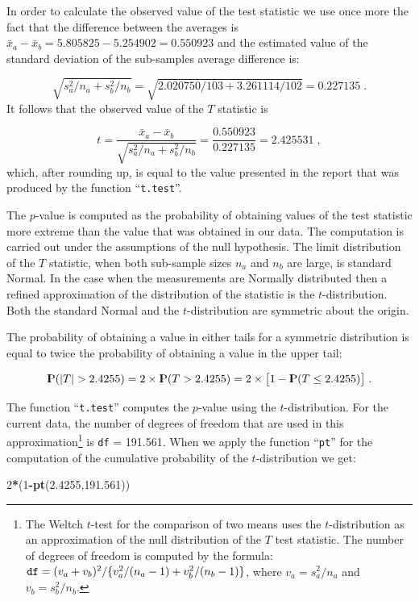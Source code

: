 \documentclass[]{krantz}
\makeatletter
\newenvironment{Shaded}{\begin{snugshade}}{\end{snugshade}}
\newcommand{\KeywordTok}[1]{\textcolor[rgb]{0.13,0.29,0.53}{\textbf{#1}}}
\newcommand{\DecValTok}[1]{\textcolor[rgb]{0.00,0.00,0.81}{#1}}
\newcommand{\FloatTok}[1]{\textcolor[rgb]{0.00,0.00,0.81}{#1}}
\newcommand{\OperatorTok}[1]{\textcolor[rgb]{0.81,0.36,0.00}{\textbf{#1}}}
\newcommand{\NormalTok}[1]{#1}
\newcommand{\Prob}{{\rm I\kern-.3em P}}
\newenvironment{kframe}{%
\medskip{}
\setlength{\fboxsep}{.8em}
 \def\at@end@of@kframe{}%
 \ifinner\ifhmode%
  \def\at@end@of@kframe{\end{minipage}}%
  \begin{minipage}{\columnwidth}%
 \fi\fi%
 \def\FrameCommand##1{\hskip\@totalleftmargin \hskip-\fboxsep
 \colorbox{shadecolor}{##1}\hskip-\fboxsep
     \hskip-\linewidth \hskip-\@totalleftmargin \hskip\columnwidth}%
 \MakeFramed {\advance\hsize-\width
   \@totalleftmargin\z@ \linewidth\hsize
   \@setminipage}}%
 {\par\unskip\endMakeFramed%
 \at@end@of@kframe}
\renewenvironment{Shaded}{\begin{kframe}}{\end{kframe}}
\theoremstyle{definition}
\theoremstyle{definition}
\theoremstyle{definition}
\theoremstyle{remark}
\makeatother
\begin{document}
In order to calculate the observed value of the test statistic we use
once more the fact that the difference between the averages is
\(\bar x_a - \bar x_b = 5.805825 - 5.254902 = 0.550923\) and the
estimated value of the standard deviation of the sub-samples average
difference is:

\[\sqrt{s_a^2/n_a + s_b^2/n_b} = \sqrt{2.020750/103 + 3.261114/102} = 0.227135\;.\]
It follows that the observed value of the \(T\) statistic is

\[t = \frac{\bar x_a - \bar x_b}{\sqrt{s_a^2/n_a + s_b^2/n_b}} = \frac{0.550923}{0.227135} = 2.425531\;,\]
which, after rounding up, is equal to the value presented in the report
that was produced by the function ``\texttt{t.test}''.

The \(p\)-value is computed as the probability of obtaining values of
the test statistic more extreme than the value that was obtained in our
data. The computation is carried out under the assumptions of the null
hypothesis. The limit distribution of the \(T\) statistic, when both
sub-sample sizes \(n_a\) and \(n_b\) are large, is standard Normal. In
the case when the measurements are Normally distributed then a refined
approximation of the distribution of the statistic is the
\(t\)-distribution. Both the standard Normal and the \(t\)-distribution
are symmetric about the origin.

The probability of obtaining a value in either tails for a symmetric
distribution is equal to twice the probability of obtaining a value in
the upper tail:

\[\Prob( |T| > 2.4255) = 2 \times \Prob( T > 2.4255) =  2 \times \big [1 - \Prob( T \leq  2.4255)\big ]\;.\]

The function ``\texttt{t.test}'' computes the \(p\)-value using the
\(t\)-distribution. For the current data, the number of degrees of
freedom that are used in this approximation\footnote{The Weltch
  \(t\)-test for the comparison of two means uses the \(t\)-distribution
  as an approximation of the null distribution of the \(T\) test
  statistic. The number of degrees of freedom is computed by the
  formula:
  \(\mbox{\texttt{df}} = (v_a + v_b)^2/\{v_a^2/(n_a-1) + v_b^2/(n_b-1)\}\),
  where \(v_a = s_a^2/n_a\) and \(v_b = s_b^2/n_b\).} is \texttt{df} =
191.561. When we apply the function ``\texttt{pt}'' for the computation
of the cumulative probability of the \(t\)-distribution we get:

\begin{Shaded}
\begin{Highlighting}[]
\DecValTok{2}\OperatorTok{*}\NormalTok{(}\DecValTok{1}\OperatorTok{-}\KeywordTok{pt}\NormalTok{(}\FloatTok{2.4255}\NormalTok{,}\FloatTok{191.561}\NormalTok{))}
\end{Highlighting}
\end{Shaded}
\end{document}
